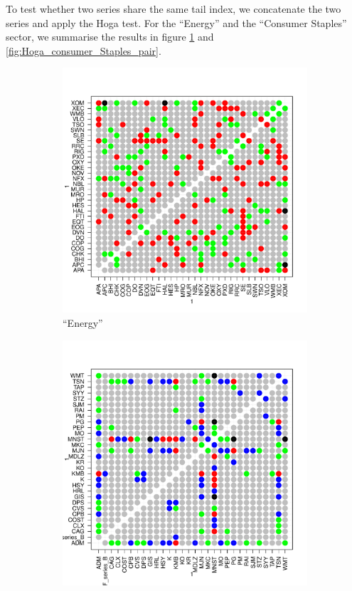 \documentclass{article}
\begin{document}
To test whether two series share the same tail index, we concatenate
the two series and apply the Hoga test. For the ``Energy'' and the
``Consumer Staples'' sector, we summarise the results in figure
\ref{fig:Hoga_Energy_pair} and \ref{fig:Hoga_consumer_Staples_pair}.
\begin{figure}[htb!]
  \begin{subfigure}[b]{0.5\linewidth}
    \includegraphics[width=\textwidth]{Hoga_Energy_pair.pdf}
    \caption{``Energy''}
    \label{fig:Hoga_Energy_pair}
  \end{subfigure}
  \begin{subfigure}[b]{0.5\linewidth}
    \includegraphics[width=\textwidth]{Hoga_Consumer_Staples_pair.pdf}

\end{subfigure}
\end{figure}
\end{document}
